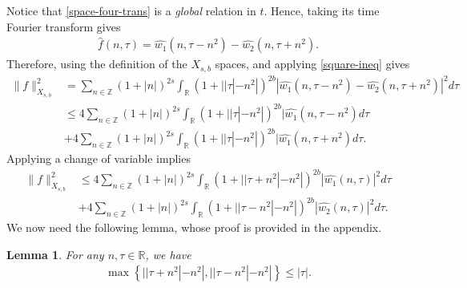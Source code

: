 \documentclass[12pt,reqno]{amsart}
\numberwithin{equation}{section}  %
\numberwithin{figure}{section}
\newcommand{\rr}{\mathbb{R}}
\newcommand{\zz}{\mathbb{Z}}
\newcommand{\wh}{\widehat}
\theoremstyle{plain}
\newtheorem{lemma}{Lemma}
\theoremstyle{definition}
\theoremstyle{remark}
\begin{document}
%
%
%
Notice that \eqref{space-four-trans} is a \emph{global} relation in $t$.
Hence, taking its time Fourier transform gives
%
%
\begin{equation}
  \label{full-fourier-trans-exp}
\begin{split}
  \wh{f}(n, \tau) = \wh{w_{1}}(n, \tau - n^{2}) - \wh{w_{2}}(n, \tau +
  n^{2}).
\end{split}
\end{equation}
%
%
Therefore, using the definition of the $X_{s,b}$ spaces, and applying
\eqref{square-ineq} gives 
%
%
\begin{equation*}
\begin{split}
  \| f \|_{X_{s,b}}^{2}
  & = \sum_{n \in \zz} (1 + |n|)^{2s} \int_{\rr} (1 + |
  | \tau | - n^{2} |)^{2b} | \wh{w_{1}}(n, \tau - n^{2}) - \wh{w_{2}}(n, \tau +
  n^{2}) |^{2} d \tau
  \\
  & \le 4 \sum_{n \in \zz} (1 + |n|)^{2s} \int_{\rr} (1 + |
  | \tau | - n^{2} |)^{2b} | \wh{w_{1}}(n, \tau - n^{2}) d \tau
  \\
  & + 4 \sum_{n \in \zz} (1 + |n|)^{2s} \int_{\rr} (1 + |
  | \tau | - n^{2} |)^{2b} | \wh{w_{1}}(n, \tau + n^{2}) d \tau.
\end{split}
\end{equation*}
%
%
Applying a change of variable implies
%
%
%
%
\begin{equation}
\begin{split}
  \| f \|_{X_{s,b}}^{2}
  & \le 4 \sum_{n \in \zz} (1 + |n|)^{2s} \int_{\rr} (1 + |
  | \tau + n^{2} | - n^{2} |)^{2b} | \wh{w_{1}}(n, \tau) |^2 d \tau
  \\
  & + 4 \sum_{n \in \zz} (1 + |n|)^{2s} \int_{\rr} (1 + |
  | \tau - n^{2} | - n^{2} |)^{2b} | \wh{w_{2}}(n, \tau )|^2 d \tau.
\end{split}
\label{comp-pre-lemma}
\end{equation}
%
%
We now need the following lemma, whose proof is provided in the appendix.
%
%
%
%
%
%
%
%
\begin{lemma}
For any $n, \tau \in \rr$, we have
\label{lem:mod-princ-symb-bound}
%
%
\begin{equation*}
\begin{split}
  \max\left\{ | | \tau + n^{2} | - n^{2} |, | | \tau - n^{2} | - n^{2} |
  \right\} \le | \tau |.
\end{split}
\end{equation*}
%
%
\end{lemma}
\end{document}
